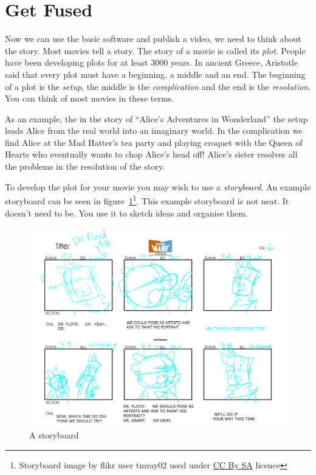 \documentclass[a5paper]{tufte-book}
\begin{document}
\section*{Get Fused}

Now we can use the basic software and publish a video, we need to think about the story.  Most movies tell a story.  The story of a movie is called its \textit{plot}.  People have been developing plots for at least 3000 years.  In ancient Greece, Aristotle said that every plot must have a beginning, a middle and an end.  The beginning of a plot is the \textit{setup}, the middle is the \textit{complication} and the end is the \textit{resolution}.  You can think of most movies in these terms.

As an example, the in the story of ``Alice's Adventures in Wonderland'' the setup leads Alice from the real world into an imaginary world.  In the complication we find Alice at the Mad Hatter's tea party and playing croquet with the Queen of Hearts who eventually wants to chop Alice's head off!  Alice's sister resolves all the problems in the resolution of the story.

To develop the plot for your movie you may wish to use a \textit{storyboard}.  An example storyboard can be seen in figure~\ref{fig:storyboard}\footnote{Storyboard image by flikr user tmray02 used under \href{http://creativecommons.org/licenses/by-sa/3.0/deed.en}{CC By SA} licence}.  This example storyboard is not neat.  It doesn't need to be.  You use it to sketch ideas and organise them.

\begin{figure}
  \includegraphics[width=\textwidth]{images/Storyboard_for_The_Radio_Adventures_of_Dr_Floyd}
  \caption{A storyboard}
  \label{fig:storyboard}
\end{figure}
\end{document}
